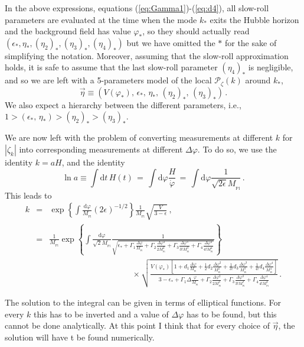 \documentclass[prd, onecolumn, floatfix, letterpaper, nofootinbib, amsmath, amssymb, superscriptaddress]{revtex4}
\renewcommand{\(}{\left(}
\renewcommand{\)}{\right)}
\renewcommand{\[}{\left[}
\renewcommand{\]}{\right]}
\def\be{\begin{equation}}
\def\ee{\end{equation}}
\def\bea{\begin{eqnarray}}
\def\eea{\end{eqnarray}}
\newcommand{\Mp}{M_{_\mathrm{Pl}}}
\begin{document}
In the above expressions, equations (\ref{eq:Gamma1})-(\ref{eq:d4}), all slow-roll parameters are evaluated at the time when the mode $k_*$ exits the Hubble horizon and the background field has value $\varphi_*$, so they should actually read $(\epsilon_*, \eta_*, (\eta_2)_*, (\eta_3)_*, (\eta_4)_*)$ but we have omitted the $*$ for the sake of simplifying the notation. Moreover, assuming that the slow-roll approximation holds, it is safe to assume that the last slow-roll parameter $ (\eta_4)_*$ is negligible, and so we are left with a 5-parameters model of the local $\mathcal{P}_\zeta(k)$ around $k_*$,
\be
	\vec{\eta}\equiv\left(V(\varphi_*),\, \epsilon_*, \,\eta_*, \, (\eta_2)_*, \,(\eta_3)_*\right)\,.
\ee
We also expect a hierarchy between the different parameters, i.e., $1> (\epsilon_*, \,\eta_*)> (\eta_2)_*>(\eta_3)_*$.

\bigskip

We are now left with the problem of converting measurements at different $k$ for $|\zeta_k|$ into corresponding measurements at different $\Delta\varphi$. To do so, we use the identity $k=aH$, and the identity
\be
	\ln a \equiv \int  \mathrm{d}t \, H(t) \, = \, \int  \mathrm{d}\varphi \frac{H}{\dot\varphi}\, =\, \int \mathrm{d}\varphi \frac{1}{\sqrt{2\epsilon}\Mp}\, .
\ee
This leads to
\bea
	k&=&\exp\left\{ \int \frac{\mathrm{d}\varphi}{\Mp}(2\epsilon)^{-1/2}  \right\}\frac{1}{\Mp}\sqrt{\frac{V}{3-\epsilon}}\, ,\\
		&=&  \frac{1}{\Mp}\exp\left\{ \int \frac{\mathrm{d}\varphi}{\sqrt{2}\Mp}\frac{1}{\sqrt{\epsilon_*+\Gamma_1\frac{\Delta\varphi}{\Mp}+\Gamma_2\frac{\Delta\varphi^2}{2\Mp^2} +\Gamma_3\frac{\Delta\varphi^3}{3!\Mp^3}+\Gamma_4\frac{\Delta\varphi^4}{4!\Mp^4} }}  \right\}
		\nonumber
		\\
		\label{eq:kDeltavarphimapping}
		&&\qquad\qquad\qquad \qquad \qquad\times \sqrt{\frac{V(\varphi_*)\left[1+d_1\frac{\Delta\varphi}{\Mp}+\frac{1}{2}d_2\frac{\Delta\varphi^2}{\Mp^2}+\frac{1}{3!}d_3\frac{\Delta\varphi^3}{\Mp^3} +\frac{1}{4!}d_4\frac{\Delta\varphi^4}{\Mp^4}\right]}{3-\epsilon_*+\Gamma_1\Delta\frac{\varphi}{\Mp}+\Gamma_2\frac{\Delta\varphi^2}{2\Mp^2} +\Gamma_3\frac{\Delta\varphi^3}{3!\Mp^3}+\Gamma_4\frac{\Delta\varphi^4}{4!\Mp^4} }}  \,  .
\eea
 
 The solution to the integral can be given in terms of elliptical functions. For every $k$ this has to be inverted and a value of $\Delta \varphi$ has to be found, but this cannot be done analytically. At this point I think that for every choice of $\vec{\eta}$, the solution will have t be found numerically.
 
\end{document}
